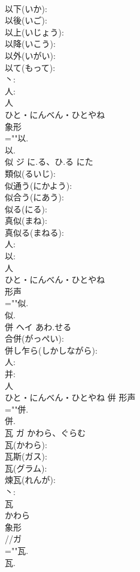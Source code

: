\documentclass[8pt]{extreport}
\begin{document}
\begin{CJK}{UTF8}{min}
\\	以下(いか): 
\\	以後(いご): 
\\	以上(いじょう): 
\\	以降(いこう): 
\\	以外(いがい): 
\\	以て(もって): 
\\	丶: 
\\	人: 
\\	人	
\\	ひと・にんべん・ひとやね	
\\	象形 
\\	=""以.
\\	以.
\\	似	ジ	に.る、ひ.る	にた	
\\	類似(るいじ): 
\\	似通う(にかよう): 
\\	似合う(にあう): 
\\	似る(にる): 
\\	真似(まね): 
\\	真似る(まねる): 
\\	人: 
\\	以: 
\\	人	
\\	ひと・にんべん・ひとやね	
\\	形声 
\\	=""似.
\\	似.
\\	併	ヘイ	あわ.せる		
\\	合併(がっぺい): 
\\	併し乍ら(しかしながら): 
\\	人: 
\\	并: 
\\	人	
\\	ひと・にんべん・ひとやね	倂	形声 
\\	=""併.
\\	併.
\\	瓦	ガ	かわら、ぐらむ		
\\	瓦(かわら): 
\\	瓦斯(ガス): 
\\	瓦(グラム): 
\\	煉瓦(れんが): 
\\	丶: 
\\	瓦	
\\	かわら	
\\	象形 
\\	//ガ 
\\	=""瓦.
\\	瓦.

\end{CJK}
\end{document}
